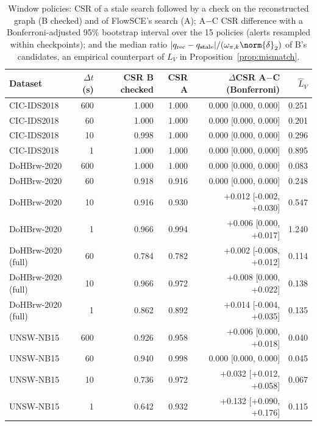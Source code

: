 \begin{table}[t]
\centering\footnotesize
\caption{Window policies: CSR of a stale search followed by a check on the reconstructed graph (B checked) and of FlowSCE's search (A); A$-$C CSR difference with a Bonferroni-adjusted 95\% bootstrap interval over the 15 policies (alerts resampled within checkpoints); and the median ratio $|q_{\rm rec}-q_{\rm stale}|/(\omega_{\pi,k}\norm{\delta}_2)$ of B's candidates, an empirical counterpart of $L_V$ in Proposition~\ref{prop:mismatch}.}
\label{tab:a-windows2}
\begin{tabular}{@{}lrrrrr@{}}
\toprule
Dataset & $\Delta t$ (s) & CSR B checked & CSR A & $\Delta$CSR A$-$C (Bonferroni) & $\hat L_V$ \\
\midrule
CIC-IDS2018 & 600 & 1.000 & 1.000 & 0.000 [0.000, 0.000] & 0.251 \\
CIC-IDS2018 & 60 & 1.000 & 1.000 & 0.000 [0.000, 0.000] & 0.201 \\
CIC-IDS2018 & 10 & 0.998 & 1.000 & 0.000 [0.000, 0.000] & 0.296 \\
CIC-IDS2018 & 1 & 1.000 & 1.000 & 0.000 [0.000, 0.000] & 0.895 \\
DoHBrw-2020 & 600 & 1.000 & 1.000 & 0.000 [0.000, 0.000] & 0.083 \\
DoHBrw-2020 & 60 & 0.918 & 0.916 & 0.000 [0.000, 0.000] & 0.248 \\
DoHBrw-2020 & 10 & 0.916 & 0.930 & +0.012 [-0.002, +0.030] & 0.547 \\
DoHBrw-2020 & 1 & 0.966 & 0.994 & +0.006 [0.000, +0.017] & 1.240 \\
DoHBrw-2020 (full) & 60 & 0.784 & 0.782 & +0.002 [-0.008, +0.012] & 0.114 \\
DoHBrw-2020 (full) & 10 & 0.966 & 0.972 & +0.008 [0.000, +0.022] & 0.138 \\
DoHBrw-2020 (full) & 1 & 0.862 & 0.892 & +0.014 [-0.004, +0.035] & 0.135 \\
UNSW-NB15 & 600 & 0.926 & 0.958 & +0.006 [0.000, +0.018] & 0.040 \\
UNSW-NB15 & 60 & 0.940 & 0.998 & 0.000 [0.000, 0.000] & 0.045 \\
UNSW-NB15 & 10 & 0.736 & 0.972 & +0.032 [+0.012, +0.058] & 0.067 \\
UNSW-NB15 & 1 & 0.642 & 0.932 & +0.132 [+0.090, +0.176] & 0.115 \\
\bottomrule
\end{tabular}
\end{table}

